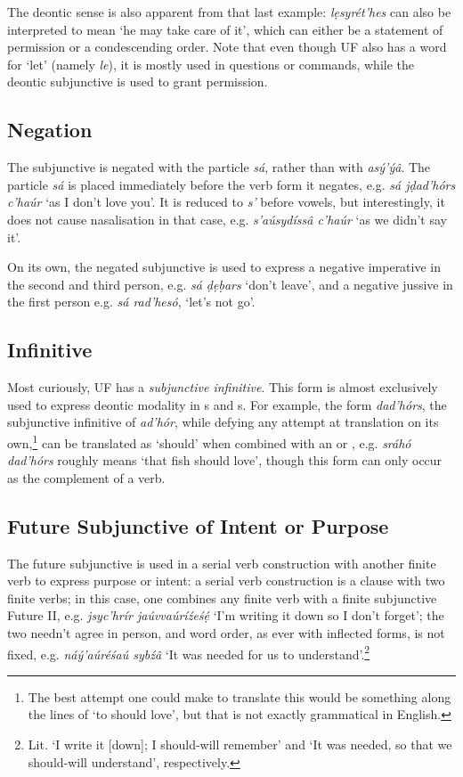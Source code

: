 \documentclass[a4paper, 12pt, twoside, openright, final]{book}
\let \w \textit
\begin{document}
The deontic sense is also apparent from that last example: \w{lẹsyrét’hes} can also be interpreted to mean ‘he
may take care of it’, which can either be a statement of permission or a condescending order. Note that even
though UF also has a word for ‘let’ (namely \w{le}), it is mostly used in questions or commands, while the
deontic subjunctive is used to grant permission.

\subsection{Negation}\label{subsubsec:negated-subjunctive}
The subjunctive is negated with the particle \w{sá}, rather than with \w{asý’ýâ}. The particle \w{sá} is placed
immediately before the verb form it negates, e.g. \w{sá jḍad’hórs c’haúr} ‘as I don’t love you’. It is reduced
to \w{s’} before vowels, but interestingly, it does not cause nasalisation in that case, e.g. \w{s’aúsydíssâ c’haúr}
‘as we didn’t say it’.

On its own, the negated subjunctive is used to express a negative imperative in the second and third person,
e.g. \w{sá ḍẹḅars} ‘don’t leave’, and a negative jussive in the first person e.g. \w{sá rad’hesó}, ‘let’s not go’.

\subsection{Infinitive}
Most curiously, UF has a \textit{subjunctive infinitive}. This form is almost exclusively used to express deontic modality
in s and s. For example, the form \w{dad’hórs}, the subjunctive infinitive of \w{ad’hór}, while defying any attempt
at translation on its own,\footnote{The best attempt one could make to translate this would be something along the
lines of ‘to should love’, but that is not exactly grammatical in English.} can be translated as ‘should’ when combined
with an  or , e.g. \w{sráhó dad’hórs} roughly means ‘that fish should love’, though this form can only
occur as the complement of a verb.

\subsection{Future Subjunctive of Intent or Purpose}
The future subjunctive is used in a serial verb construction with another finite verb to express purpose or intent: a
serial verb construction is a clause with two finite verbs; in this case, one combines any finite verb with
a finite subjunctive Future II, e.g. \w{jsyc’hrír jaúvvaúríźeśẹ́} ‘I’m writing
it down so I don’t forget’; the two needn’t agree in person, and word order, as ever with inflected forms, is not fixed,
e.g. \w{náý’aúréśaú sybźâ} ‘It was needed
for us to understand’.\footnote{Lit. ‘I write it [down]; I should-will remember’ and ‘It was needed, so that we
should-will understand’, respectively.}
\end{document}
